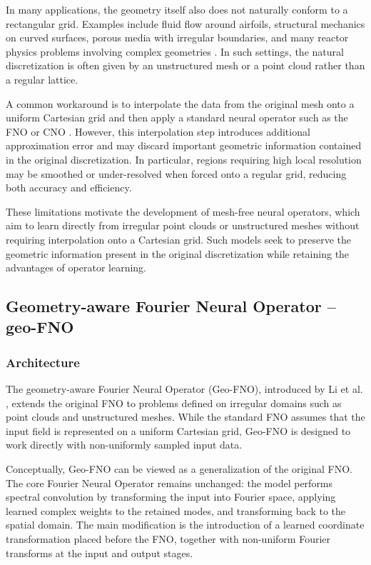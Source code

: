 In many applications, the geometry itself also does not naturally conform to a rectangular grid. Examples include fluid flow around airfoils, structural mechanics on curved surfaces, porous media with irregular boundaries, and many reactor physics problems involving complex geometries \cite{irregular-data}. In such settings, the natural discretization is often given by an unstructured mesh or a point cloud rather than a regular lattice.

A common workaround is to interpolate the data from the original mesh onto a uniform Cartesian grid and then apply a standard neural operator such as the FNO or CNO \cite{li2021fno}. However, this interpolation step introduces additional approximation error and may discard important geometric information contained in the original discretization. In particular, regions requiring high local resolution may be smoothed or under-resolved when forced onto a regular grid, reducing both accuracy and efficiency.

These limitations motivate the development of mesh-free neural operators, which aim to learn directly from irregular point clouds or unstructured meshes without requiring interpolation onto a Cartesian grid. Such models seek to preserve the geometric information present in the original discretization while retaining the advantages of operator learning.

\subsection{Geometry-aware Fourier Neural Operator -- geo-FNO}

\subsubsection{Architecture}

The geometry-aware Fourier Neural Operator (Geo-FNO), introduced by Li et al. \cite{geo-fno}, extends the original FNO to problems defined on irregular domains such as point clouds and unstructured meshes. While the standard FNO assumes that the input field is represented on a uniform Cartesian grid, Geo-FNO is designed to work directly with non-uniformly sampled input data.

Conceptually, Geo-FNO can be viewed as a generalization of the original FNO. The core Fourier Neural Operator remains unchanged: the model performs spectral convolution by transforming the input into Fourier space, applying learned complex weights to the retained modes, and transforming back to the spatial domain. The main modification is the introduction of a learned coordinate transformation placed before the FNO, together with non-uniform Fourier transforms at the input and output stages.

